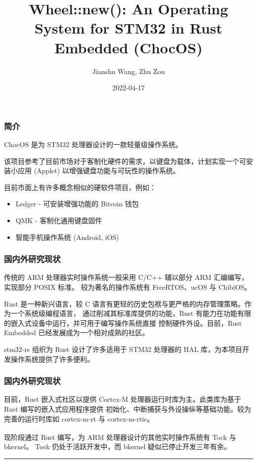 \documentclass[aspectratio=169]{ctexbeamer}
\title{Wheel::new(): An Operating System for STM32 in Rust Embedded (ChocOS)}
\author{Jianshu Wang, Zhu Zou}
\date{2022-04-17}
\begin{document}
\maketitle

\begin{frame}
    \frametitle{简介}
    ChocOS 是为 STM32 处理器设计的一款轻量级操作系统。
    \par
    该项目参考了目前市场对于客制化硬件的需求，以键盘为载体，计划实现一个可安装小应用 (Applet) 
    以增强键盘功能与可玩性的操作系统。
    \par
    目前市面上有许多概念相似的硬软件项目，例如：
    \begin{itemize}
        \item Ledger - 可安装增强功能的 Bitcoin 钱包
        \item QMK - 客制化通用键盘固件
        \item 智能手机操作系统 (Android, iOS)
    \end{itemize}
\end{frame}

\begin{frame}
    \frametitle{国内外研究现状}

    传统的 ARM 处理器实时操作系统一般采用 C/C++ 辅以部分 ARM 汇编编写，实现部分 POSIX 标准。
    较为著名的操作系统有 FreeRTOS、ucOS 与 ChibiOS。
    \par
    Rust 是一种新兴语言，较 C 语言有更轻的历史包袱与更严格的内存管理策略。作为一个系统级编程语言，
    通过削减其标准库提供的功能，Rust 有能力在功能有限的嵌入式设备中运行，并可用于编写操作系统直接
    控制硬件外设。目前，Rust Embedded 已经发展成为一个相对成熟的社区。
    \par
    stm32-rs 组织为 Rust 设计了许多适用于 STM32 处理器的 HAL 库，为本项目开发操作系统提供了许多便利。

\end{frame}

\begin{frame}
    \frametitle{国内外研究现状}

    目前，Rust 嵌入式社区以提供 Cortex-M 处理器运行时库为主。此类库为基于 Rust 编写的嵌入式应用程序提供
    初始化、中断捕获与外设操纵等基础功能。较为完善的运行时库如 cortex-m-rt 与 cortex-m-rtic。
    \par
    现阶段通过 Rust 编写，为 ARM 处理器设计的其他实时操作系统有 Tock\textsuperscript{\cite{levy17multiprogramming}} 与 bkernel。
    Tock 仍处于活跃开发中，而 bkernel 疑似已停止开发三年有余。

    \par

    \vfill
    \noindent\rule{2cm}{0.4pt}
    \printbibliography

\end{frame}
\end{document}

